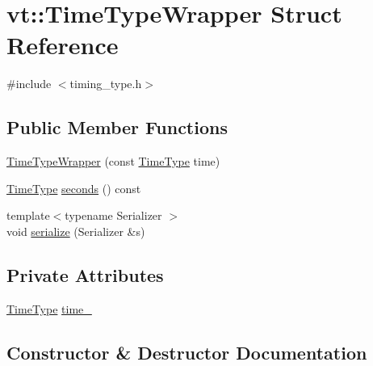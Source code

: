 \hypertarget{structvt_1_1_time_type_wrapper}{}\section{vt\+:\+:Time\+Type\+Wrapper Struct Reference}
\label{structvt_1_1_time_type_wrapper}


{\ttfamily \#include $<$timing\+\_\+type.\+h$>$}

\subsection*{Public Member Functions}
\begin{DoxyCompactItemize}
\item 
\hyperlink{structvt_1_1_time_type_wrapper_a5309dddc7320386d0eb9193c543b1aa2}{Time\+Type\+Wrapper} (const \hyperlink{namespacevt_a876a9d0cd5a952859c72de8a46881442}{Time\+Type} time)
\item 
\hyperlink{namespacevt_a876a9d0cd5a952859c72de8a46881442}{Time\+Type} \hyperlink{structvt_1_1_time_type_wrapper_a273f563634235579596769029c13d04c}{seconds} () const
\item 
{\footnotesize template$<$typename Serializer $>$ }\\void \hyperlink{structvt_1_1_time_type_wrapper_aa5c7311e8b108c65a4af7118163f18c8}{serialize} (Serializer \&s)
\end{DoxyCompactItemize}
\subsection*{Private Attributes}
\begin{DoxyCompactItemize}
\item 
\hyperlink{namespacevt_a876a9d0cd5a952859c72de8a46881442}{Time\+Type} \hyperlink{structvt_1_1_time_type_wrapper_a9fb04e50743e0d2b5f5727d1378bcda4}{time\+\_\+}
\end{DoxyCompactItemize}


\subsection{Constructor \& Destructor Documentation}
\mbox{\label{structvt_1_1_time_type_wrapper_a5309dddc7320386d0eb9193c543b1aa2}} 
